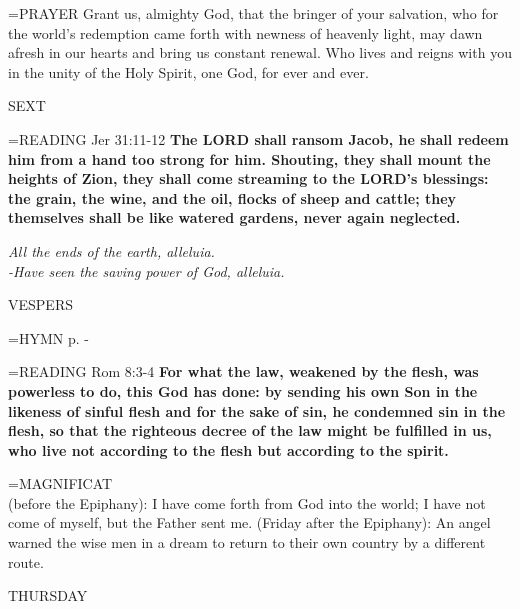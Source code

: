 \hangindent=\parindent \small{PRAYER 	Grant us, almighty God, that the bringer of your salvation, who for the world's redemption came forth with newness of heavenly light, may dawn afresh in our hearts and bring us constant renewal. Who lives and reigns with you in the unity of the Holy Spirit, one God, for ever and ever.}

\begin{flushleft}\normalsize SEXT\\\end{flushleft}

\hangindent=\parindent \small{READING}    Jer 31:11-12 \textbf{   The LORD shall ransom Jacob, he shall redeem him from a hand too strong for him. Shouting, they shall mount the heights of Zion, they shall come streaming to the LORD’s blessings: the grain, the wine, and the oil, flocks of sheep and cattle; they themselves shall be like watered gardens, never again neglected.}

\begin{center}
\textit{All the ends of the earth, alleluia.\\
-Have seen the saving power of God, alleluia.}
\end{center}

\begin{flushleft}\normalsize VESPERS\\\end{flushleft}

\hangindent=\parindent \small{\uppercase{HYMN} p.  \pageref{christmas:firstHymn} - \pageref{christmas:lastHymn}\\}

\hangindent=\parindent \small{READING}    Rom 8:3-4 \textbf{   For what the law, weakened by the flesh, was powerless to do, this God has done: by sending his own Son in the likeness of sinful flesh and for the sake of sin, he condemned sin in the flesh, so that the righteous decree of the law might be fulfilled in us, who live not according to the flesh but according to the spirit.\\}

\hangindent=\parindent \small{MAGNIFICAT \\}
(before the Epiphany): I have come forth from God into the world; I have not come of myself, but the Father sent me.
(Friday after the Epiphany): An angel warned the wise men in a dream to return to their own country by a different route.


\begin{center}
\normalsize THURSDAY
\end{center}


